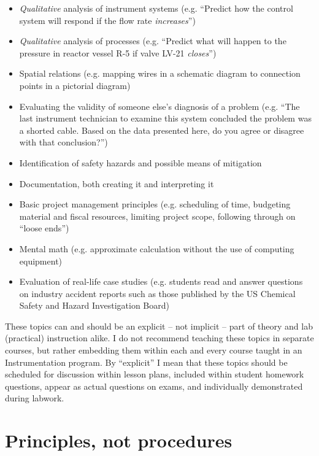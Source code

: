 \begin{itemize}
\item \textit{Qualitative} analysis of instrument systems (e.g. ``Predict how the control system will respond if the flow rate \textit{increases}'')
\item \textit{Qualitative} analysis of processes (e.g. ``Predict what will happen to the pressure in reactor vessel R-5 if valve LV-21 \textit{closes}'')
\item Spatial relations (e.g. mapping wires in a schematic diagram to connection points in a pictorial diagram)
\item Evaluating the validity of someone else's diagnosis of a problem (e.g. ``The last instrument technician to examine this system concluded the problem was a shorted cable.  Based on the data presented here, do you agree or disagree with that conclusion?'')
\item Identification of safety hazards and possible means of mitigation
\item Documentation, both creating it and interpreting it
\item Basic project management principles (e.g. scheduling of time, budgeting material and fiscal resources, limiting project scope, following through on ``loose ends'')
\item Mental math (e.g. approximate calculation without the use of computing equipment)
\item Evaluation of real-life case studies (e.g. students read and answer questions on industry accident reports such as those published by the US Chemical Safety and Hazard Investigation Board)
\end{itemize}

These topics can and should be an explicit -- not implicit -- part of theory and lab (practical) instruction alike.  I do not recommend teaching these topics in separate courses, but rather embedding them within each and every course taught in an Instrumentation program.  By ``explicit'' I mean that these topics should be scheduled for discussion within lesson plans, included within student homework questions, appear as actual questions on exams, and individually demonstrated during labwork.










\filbreak
\section{Principles, not procedures}

